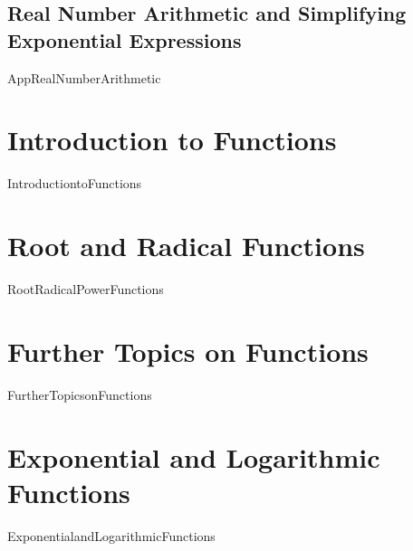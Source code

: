 \documentclass[11pt]{book}
\begin{document}
\section{Real Number Arithmetic and Simplifying Exponential Expressions}
{AppRealNumberArithmetic}

\chapter{Introduction to Functions}
\label{IntroductiontoFunctions}
\thispagestyle{empty}
{IntroductiontoFunctions}



\chapter{Root and Radical Functions}
\label{RootRadicalPowerFunctions}
\thispagestyle{empty}
{RootRadicalPowerFunctions}

\chapter{Further Topics on Functions}
\label{FurtherTopicsonFunctions}
\thispagestyle{empty}
{FurtherTopicsonFunctions}

\chapter{Exponential and Logarithmic Functions}
\label{ExponentialandLogarithmicFunctions}
\thispagestyle{empty}
{ExponentialandLogarithmicFunctions}

\end{document}

